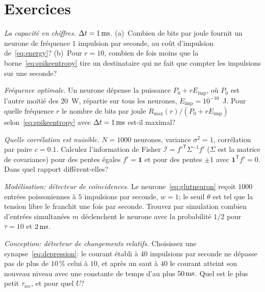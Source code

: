 \section{Exercices}

\begin{exercise}[\lvlA]
\label{ex:04:1}
\emph{La capacité en chiffres.} $\Delta t=1\,\text{ms}$. (a)~Combien de bits par joule fournit un neurone de fréquence $1$ impulsion par seconde, au coût d'impulsion de~\eqref{eq:energy}? (b)~Pour $r=10$, combien de fois moins que la borne~\eqref{eq:spikeentropy} tire un destinataire qui ne fait que compter les impulsions sur une seconde?
\end{exercise}

\begin{exercise}[\lvlB]
\label{ex:04:2}
\emph{Fréquence optimale.} Un neurone dépense la puissance $P_0+rE_{\text{imp}}$, où $P_0$ est l'autre moitié des $20$~W, répartie sur tous les neurones, $E_{\text{imp}}=10^{-10}$~J. Pour quelle fréquence $r$ le nombre de bits par joule $R_{\max}(r)/(P_0+rE_{\text{imp}})$ selon~\eqref{eq:spikeentropy} avec $\Delta t=1\,\text{ms}$ est-il maximal?
\end{exercise}

\begin{exercise}[\lvlB]
\label{ex:04:3}
\emph{Quelle corrélation est nuisible.} $N=1000$ neurones, variance $\sigma^2=1$, corrélation par paire $c=0.1$. Calculez l'information de Fisher $\mathcal I=f'^{\mathsf T}\Sigma^{-1}f'$ ($\Sigma$ est la matrice de covariance) pour des pentes égales $f'=\mathbf 1$ et pour des pentes $\pm1$ avec $\mathbf 1^{\mathsf T}f'=0$. Dans quel rapport diffèrent-elles?
\end{exercise}

\begin{exercise}[\lvlB]
\label{ex:04:4}
\emph{Modélisation: détecteur de coïncidences.} Le neurone~\eqref{eq:glutneuron} reçoit $1000$ entrées poissoniennes à $5$ impulsions par seconde, $w=1$; le seuil $\theta$ est tel que la tension libre le franchit une fois par seconde. Trouvez par simulation combien d'entrées simultanées $m$ déclenchent le neurone avec la probabilité $1/2$ pour $\tau=10$ et $2\,\text{ms}$.
\end{exercise}

\begin{exercise}[\lvlB]
\label{ex:04:5}
\emph{Conception: détecteur de changements relatifs.} Choisissez une synapse~\eqref{eq:depression}: le courant établi à $40$ impulsions par seconde ne dépasse pas de plus de $10\,\%$ celui à $10$, et après un saut à $40$ le courant atteint son nouveau niveau avec une constante de temps d'au plus $50\,\text{ms}$. Quel est le plus petit $\tau_{\text{rec}}$, et pour quel $U$?
\end{exercise}

